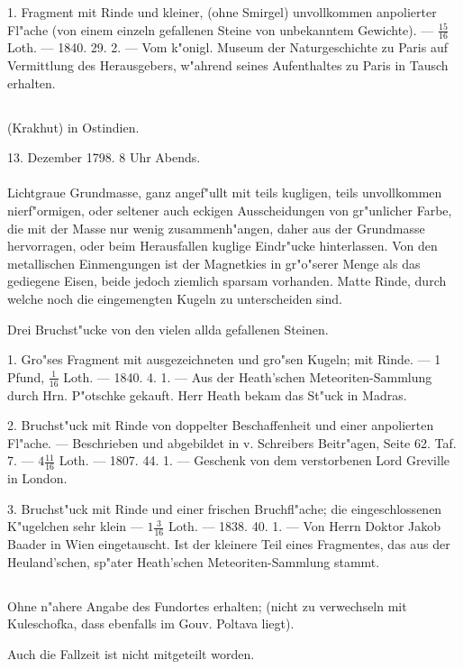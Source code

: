 \documentclass[a4paper, 11pt, oneside, polutonikogreek, german]{article}
\begin{document}
1. Fragment mit Rinde und kleiner, (ohne Smirgel) unvollkommen anpolierter Fl"ache (von einem einzeln gefallenen Steine von unbekanntem Gewichte). --- $\mathfrak{\frac{15}{16}}$ Loth. --- 1840. 29. 2. --- Vom k"onigl. Museum der Naturgeschichte zu Paris auf Vermittlung des Herausgebers, w"ahrend seines Aufenthaltes zu Paris in Tausch erhalten.
\subsection{}
\begin{center}

(Krakhut) in Ostindien.

13. Dezember 1798. 8 Uhr Abends.
\end{center}
\paragraph{}
Lichtgraue Grundmasse, ganz angef"ullt mit teils kugligen, teils unvollkommen nierf"ormigen, oder seltener auch eckigen Ausscheidungen von gr"unlicher Farbe, die mit der Masse nur wenig zusammenh"angen, daher aus der Grundmasse hervorragen, oder beim Herausfallen kuglige Eindr"ucke hinterlassen. Von den metallischen Einmengungen ist der Magnetkies in gr"o"serer Menge als das gediegene Eisen, beide jedoch ziemlich sparsam vorhanden. Matte Rinde, durch welche noch die eingemengten Kugeln zu unterscheiden sind.

Drei Bruchst"ucke von den vielen allda gefallenen Steinen.

1. Gro"ses Fragment mit ausgezeichneten und gro"sen Kugeln; mit Rinde. --- 1 Pfund, $\mathfrak{\frac{1}{16}}$ Loth. --- 1840. 4. 1. --- Aus der Heath'schen Meteoriten-Sammlung durch Hrn. P"otschke gekauft. Herr Heath bekam das St"uck in Madras.

2. Bruchst"uck mit Rinde von doppelter Beschaffenheit und einer anpolierten Fl"ache. --- Beschrieben und abgebildet in v. Schreibers Beitr"agen, Seite 62. Taf. 7. --- $\mathfrak{4\frac{11}{16}}$ Loth. --- 1807. 44. 1. --- Geschenk von dem verstorbenen Lord Greville in London.

3. Bruchst"uck mit Rinde und einer frischen Bruchfl"ache; die eingeschlossenen K"ugelchen sehr klein --- $\mathfrak{1\frac{3}{16}}$ Loth. --- 1838. 40. 1. --- Von Herrn Doktor Jakob Baader in Wien eingetauscht. Ist der kleinere Teil eines Fragmentes, das aus der Heuland'schen, sp"ater Heath'schen Meteoriten-Sammlung stammt.
\subsection{}
\begin{center}

Ohne n"ahere Angabe des Fundortes erhalten; (nicht zu verwechseln mit Kuleschofka, dass ebenfalls im Gouv. Poltava liegt).

Auch die Fallzeit ist nicht mitgeteilt worden.
\end{center}
\end{document}
